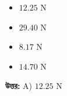 \documentclass[12pt, a4paper]{article}
\begin{document}
\begin{itemize}[label={}, leftmargin=1cm, itemsep=0.5em]
    \item[\textbf{A)}]  $12.25\text{ N}$
    \item[\textbf{B)}]  $29.40\text{ N}$
    \item[\textbf{C)}]  $8.17\text{ N}$
    \item[\textbf{D)}]  $14.70\text{ N}$
\end{itemize}

\vspace{0.5em}
\begin{tcolorbox}[answerbox]
    \textbf{\color{success} উত্তর:} A)  $12.25\text{ N}$
\end{tcolorbox}
\vspace{1em}
\end{document}
